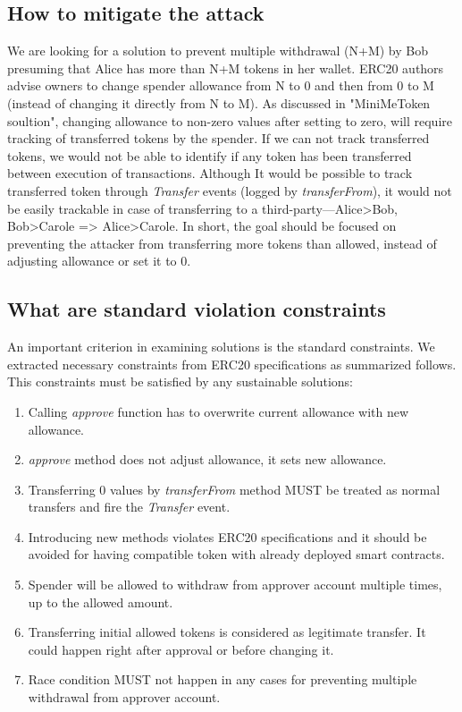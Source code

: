 \subsection{How to mitigate the attack}
We are looking for a solution to prevent multiple withdrawal (N+M) by Bob presuming that Alice has more than N+M tokens in her wallet. ERC20 authors advise owners to change spender allowance from N to 0 and then from 0 to M (instead of changing it directly from N to M). As discussed in "MiniMeToken soultion", changing allowance to non-zero values after setting to zero, will require tracking of transferred tokens by the spender. If we can not track transferred tokens, we would not be able to identify if any token has been transferred between execution of transactions. Although It would be possible to track transferred token through \textit{Transfer} events (logged by \textit{transferFrom}), it would not be easily trackable in case of transferring to a third-party---Alice>Bob, Bob>Carole => Alice>Carole. In short, the goal should be focused on preventing the attacker from transferring more tokens than allowed, instead of adjusting allowance or set it to 0. 

\subsection{What are standard violation constraints}
An important criterion in examining solutions is the standard constraints. We extracted necessary constraints from ERC20 specifications as summarized follows. This constraints must be satisfied by any sustainable solutions:
\begin{enumerate}
	\item Calling \textit{approve} function has to overwrite current allowance with new allowance.
	\item \textit{approve} method does not adjust allowance, it sets new allowance.
	\item Transferring 0 values by \textit{transferFrom} method MUST be treated as normal transfers and fire the \textit{Transfer} event.
	\item Introducing new methods violates ERC20 specifications and it should be avoided for having compatible token with already deployed smart contracts.
	\item Spender will be allowed to withdraw from approver account multiple times, up to the allowed amount.
	\item Transferring initial allowed tokens is considered as legitimate transfer. It could happen right after approval or before changing it.
	\item Race condition MUST not happen in any cases for preventing multiple withdrawal from approver account.\newline
\end{enumerate}
